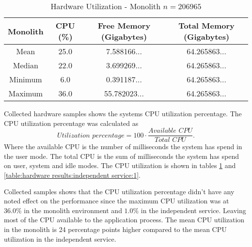 \begin{table}[h!]
    \begin{tabular}{|c|c|c|c|} 
        \hline
        Monolith
        & CPU (\%)
        & Free Memory (Gigabytes)
        & Total Memory (Gigabytes) \\ [0.5ex] 
        
        \hline\hline
        Mean
        & 25.0
        & 7.588166...
        & 64.265863... \\ 
        
        Median
        & 22.0
        & 3.699269...
        & 64.265863... \\ 

        Minimum
        & 6.0
        & 0.391187...
        & 64.265863... \\ 
        
        Maximum
        & 36.0
        & 55.782023...
        & 64.265863... \\
        \hline
    \end{tabular}
    \caption{Hardware Utilization - Monolith $n=206 965$}
    \label{table:hardware results:monolith:1}
\end{table}

Collected hardware samples shows the systems CPU utilization percentage.
The CPU utilization percentage was calculated as
\[
\textit{Utilization percentage} = 100 \cdot \frac{\textit{Available CPU}}{\textit{Total CPU}}
.\]
Where the available CPU is the number of milliseconds the system has spend in the user mode.
The total CPU is the sum of milliseconds the system has spend on user, system and idle modes. The CPU utilization is shown in tables \ref{table:hardware results:monolith:1} and \ref{table:hardware results:independent service:1}.

Collected samples shows that the CPU utilization percentage didn't have any noted effect on the performance since the maximum CPU utilization was at $36.0\%$ in the monolith environment and $1.0\%$ in the independent service.
Leaving most of the CPU available to the application process.
The mean CPU utilization in the monolith is 24 percentage points higher compared to the mean CPU utilization in the independent service.

